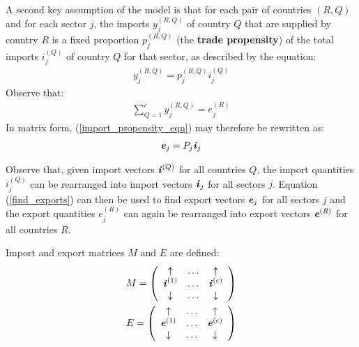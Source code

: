 \documentclass[preprint,authoryear,3p]{elsarticle}
\begin{document}
\noindent A second key assumption of the model is that for each pair of countries $(R,Q)$ and for each sector $j$, the imports $y^{(R,Q)}_{j}$ of country $Q$ that are supplied by country $R$ is a fixed proportion $p^{(R,Q)}_{j}$ (the \textbf{trade propensity}) of the total imports $i^{(Q)}_j$ of country $Q$ for that sector, as described by the equation:
\begin{align} \label{import_propensity_eqn}
y^{(R,Q)}_{j} = p^{(R,Q)}_{j} i^{(Q)}_j
\end{align}
Observe that:
\begin{align}
\displaystyle \sum_{Q=1}^{c} y^{(R,Q)}_{j} = e^{(R)}_j
\end{align}
In matrix form, (\ref{import_propensity_eqn}) may therefore be rewritten as:
\begin{align} \label{find_exports}
\textbf{\textit{e}}_j = P_{j} \textbf{\textit{i}}_j
\end{align}

\noindent Observe that, given import vectors $\textbf{\textit{i}}^{(Q)}$ for all countries $Q$, the import quantities $i^{(Q)}_j$ can be rearranged into import vectors $\textbf{\textit{i}}_j$ for all sectors $j$. Equation (\ref{find_exports}) can then be used to find export vectors $\textbf{\textit{e}}_j$ for all sectors $j$ and the export quantities $e^{(R)}_j$ can again be rearranged into export vectors $\textbf{\textit{e}}^{(R)}$ for all countries $R$.





\clearpage





\noindent Import and export matrices $M$ and $E$ are defined:
\begin{align*}
M = \left(
\begin{array}{ccc}
\uparrow & \hdots & \uparrow \\
{\textbf{\textit{i}}^{(1)}} & \hdots & {\textbf{\textit{i}}^{(c)}} \\
\downarrow & \hdots & \downarrow
\end{array} \right)
\\
E = \left(
\begin{array}{ccc}
\uparrow & \hdots & \uparrow \\
{\textbf{\textit{e}}^{(1)}} & \hdots & {\textbf{\textit{e}}^{(c)}} \\
\downarrow & \hdots & \downarrow
\end{array} \right)
\end{align*}
\end{document}
